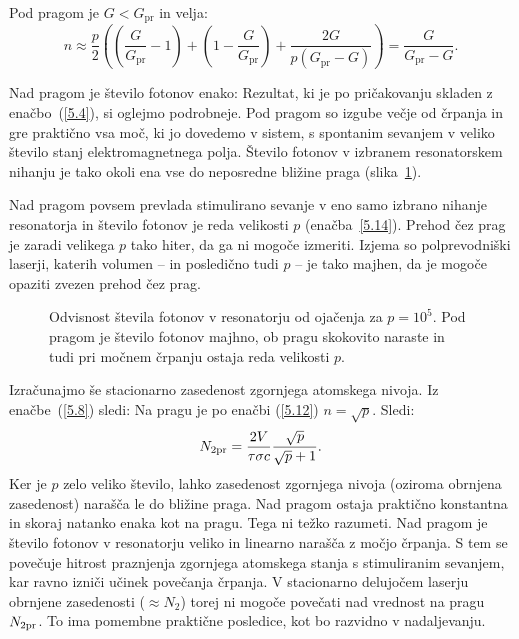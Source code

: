 Pod pragom je $G<G_\mathrm{pr}$ in velja:
\begin{equation}
n\approx \frac{p}{2}\left( \left(\frac{G}{G_\mathrm{pr}}-1\right)+\left(1
-\frac{G}{G_\mathrm{pr}}\right)+\frac{2G}{p(G_\mathrm{pr}-G)}\right) =\frac{G}{G_\mathrm{pr}-G}.
\label{5.13}
\end{equation}

Nad pragom je število fotonov enako:
Rezultat, ki je po pričakovanju skladen z enačbo~(\ref{5.4}), si oglejmo podrobneje. 
Pod pragom so izgube večje od črpanja in gre praktično vsa moč, ki jo dovedemo v sistem, 
s spontanim sevanjem v veliko število stanj elektromagnetnega polja. 
Število fotonov v izbranem resonatorskem nihanju je tako okoli 
ena vse do neposredne bližine praga (slika~\ref{fig:p}). 

Nad pragom povsem prevlada stimulirano sevanje 
v eno samo izbrano nihanje resonatorja in število fotonov je reda velikosti 
$p$ (enačba~\ref{5.14}).
Prehod čez prag je zaradi velikega $p$ tako hiter, da ga ni mogoče izmeriti.
Izjema so polprevodniški laserji, katerih 
volumen -- in posledično tudi $p$ -- 
je tako majhen, da je mogoče opaziti zvezen prehod čez prag.
\begin{figure}[ht]
\centering
\def\svgwidth{50truemm} 

\caption{Odvisnost števila fotonov v resonatorju od ojačenja za $p=10^5$. 
Pod pragom je število fotonov majhno, ob pragu skokovito naraste in tudi 
pri močnem črpanju ostaja reda velikosti $p$.}
\label{fig:p}
\end{figure}

Izračunajmo še stacionarno zasedenost zgornjega atomskega nivoja. Iz 
enačbe~(\ref{5.8}) sledi:
Na pragu je po enačbi (\ref{5.12}) $n=\sqrt{p}$. 
Sledi:
\begin{equation}  
N_{\rm 2pr}=\frac{2V}{\tau \sigma c}\frac{\sqrt{p}}{\sqrt{p}+1}.
\label{5.16}
\end{equation}
Ker je $p$ zelo veliko število, lahko zasedenost zgornjega
nivoja (oziroma obrnjena zasedenost) narašča le do bližine praga. Nad pragom ostaja praktično
konstantna in skoraj natanko enaka kot na pragu. Tega ni težko razumeti. Nad
pragom je število fotonov v resonatorju veliko in linearno narašča 
z močjo črpanja. S tem se povečuje hitrost praznjenja zgornjega atomskega 
stanja s stimuliranim sevanjem, kar ravno izniči učinek povečanja črpanja. 
V stacionarno delujočem laserju obrnjene zasedenosti ($\approx N_2$) 
torej ni mogoče povečati 
nad vrednost na pragu $N_{\rm 2pr}$. To ima pomembne praktične posledice, 
kot bo razvidno v nadaljevanju.

